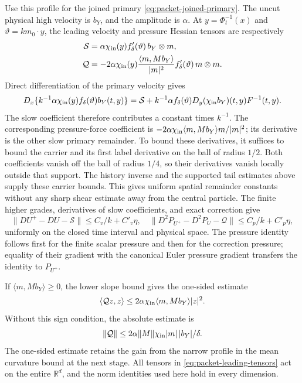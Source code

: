 \documentclass[11pt]{article}
\newcommand{\R}{\mathbb R}
\theoremstyle{definition}
\begin{document}
Use this profile for the joined primary \eqref{eq:packet-joined-primary}.
The uncut physical high velocity is $b_Y$, and the amplitude is $\alpha$.
At
$y=\Phi_t^{-1}(x)$ and $\vartheta=km_0\cdot y$, the leading velocity
and pressure Hessian tensors are respectively
\begin{align}
 \mathcal S&=\alpha\chi_{\rm in}(y)f_\delta'(\vartheta)\,
                   b_Y\otimes m,\notag\\
\mathcal Q&=-2\alpha\chi_{\rm in}(y)
       \frac{\langle m,Mb_Y\rangle}{|m|^2}
       f_\delta'(\vartheta)\,m\otimes m.
                                                        \label{eq:packet-leading-tensors}
\end{align}
Direct differentiation of the primary velocity gives
\[
 D_x\{k^{-1}\alpha\chi_{\rm in}(y)f_\delta(\vartheta)b_Y(t,y)\}
 =\mathcal S+k^{-1}\alpha f_\delta(\vartheta)
                    D_y(\chi_{\rm in}b_Y)(t,y)F^{-1}(t,y).
\]
The slow coefficient therefore contributes a constant times $k^{-1}$.
The corresponding pressure-force coefficient is
$-2\alpha\chi_{\rm in}\langle m,Mb_Y\rangle m/|m|^2$;
its derivative is the other slow primary remainder. To bound these
derivatives, it suffices to bound the carrier and its first
label derivative on the ball of radius $1/2$. Both coefficients
vanish off the ball of radius $1/4$, so their derivatives vanish
locally outside that support. The history inverse and the supported
tail estimates above supply these carrier bounds. This gives uniform
spatial remainder constants without any sharp shear estimate away
from the central particle.
The finite higher grades, derivatives of slow coefficients, and
exact correction give
\begin{equation}\label{eq:packet-low-errors}
 \|DU^+-DU-\mathcal S\|\le C_v/k+C'_v\eta,
 \quad
 \|D^2P_{U^+}-D^2P_U-\mathcal Q\|\le C_p/k+C'_p\eta,
\end{equation}
uniformly on the closed time interval and physical space. The pressure
identity follows first for the finite scalar pressure and then for
the correction pressure; equality of their gradient with the
canonical Euler pressure gradient transfers the identity to
$P_{U^+}$.

If $\langle m,Mb_Y\rangle\ge0$, the lower slope bound gives the one-sided
estimate
\begin{equation}\label{eq:packet-signed-curvature}
 \langle\mathcal Qz,z\rangle
 \le2\alpha\chi_{\rm in}\langle m,Mb_Y\rangle |z|^2.
\end{equation}
Without this sign condition, the absolute estimate is
\[
 \|\mathcal Q\|\le
   2\alpha\|M\|\chi_{\rm in}|m|\,|b_Y|/\delta.
\]
The one-sided estimate retains the gain from the narrow profile in the
mean curvature bound at the next stage.
All tensors in \eqref{eq:packet-leading-tensors} act on the entire
$\R^d$, and the norm identities used here hold in every dimension.
\end{document}
